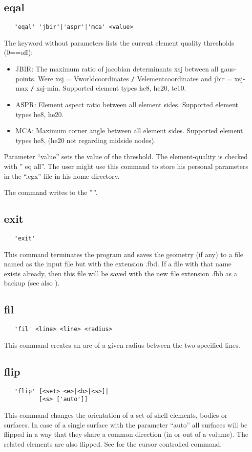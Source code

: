 \documentclass{article}
\begin{document}
\subsection{\label{eqal}eqal}
\begin{verbatim}
   'eqal' 'jbir'|'aspr'|'mca' <value>
\end{verbatim}
The keyword without parameters lists the current element quality thresholds (0==off):
\begin{itemize}
\item JBIR: The maximum ratio of jacobian determinants xsj between all gaus-points. Were xsj = Vworldcoordinates \verb_/_ Velementcoordinates and jbir = xsj-max \verb_/_ xsj-min. Supported element types he8, he20, te10.
\item ASPR: Element aspect ratio between all element sides. Supported element types he8, he20.
\item MCA: Maximum corner angle between all element sides. Supported element types he8, (he20 not regarding midside nodes).
\end{itemize}
Parameter ``value'' sets the value of the threshold. The element-quality is checked with '' eq all''. The user might use this command to store his personal parameters in the ``.cgx'' file in his home directory.

The command writes to the ''''.

\subsection{\label{exit}exit}
\begin{verbatim}
   'exit' 
\end{verbatim}
This command terminates the program and saves the geometry (if any) to a file named as the input file but with the extension .fbd. If a file with that name exists already, then this file will be saved with the new file extension .fbb as a backup (see also ).

\subsection{\label{fil}fil}
\begin{verbatim}
   'fil' <line> <line> <radius>
\end{verbatim}
This command creates an arc of a given radius between the two specified lines.

\subsection{\label{flip}flip}
\begin{verbatim}
   'flip' [<set> <e>|<b>|<s>]|
          [<s> ['auto']]

\end{verbatim}
This command changes the orientation of a set of shell-elements, bodies or surfaces. In case of a single surface with the parameter ``auto'' all surfaces will be flipped in a way that they share a common direction (in or out of a volume). The related elements are also flipped. See  for the cursor controlled command.
\end{document}

